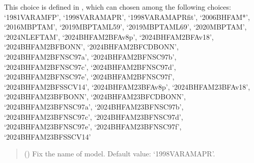 \documentclass[letterpaper,10pt,english]{sphinxmanual}
\begin{document}
\begin{fulllineitems}
\sphinxAtStartPar
This choice is defined in , which can chosen among     the following choices:     ‘1981\sphinxhyphen{}VAR\sphinxhyphen{}AM\sphinxhyphen{}FP’, ‘1998\sphinxhyphen{}VAR\sphinxhyphen{}AM\sphinxhyphen{}APR’, ‘1998\sphinxhyphen{}VAR\sphinxhyphen{}AM\sphinxhyphen{}APR\sphinxhyphen{}fit’, ‘2006\sphinxhyphen{}BHF\sphinxhyphen{}AM*’,     ‘2016\sphinxhyphen{}MBPT\sphinxhyphen{}AM’, ‘2019\sphinxhyphen{}MBPT\sphinxhyphen{}AM\sphinxhyphen{}L59’, ‘2019\sphinxhyphen{}MBPT\sphinxhyphen{}AM\sphinxhyphen{}L69’,     ‘2020\sphinxhyphen{}MBPT\sphinxhyphen{}AM’, ‘2024\sphinxhyphen{}NLEFT\sphinxhyphen{}AM’,     ‘2024\sphinxhyphen{}BHF\sphinxhyphen{}AM\sphinxhyphen{}2BF\sphinxhyphen{}Av8p’, ‘2024\sphinxhyphen{}BHF\sphinxhyphen{}AM\sphinxhyphen{}2BF\sphinxhyphen{}Av18’, ‘2024\sphinxhyphen{}BHF\sphinxhyphen{}AM\sphinxhyphen{}2BF\sphinxhyphen{}BONN’, ‘2024\sphinxhyphen{}BHF\sphinxhyphen{}AM\sphinxhyphen{}2BF\sphinxhyphen{}CDBONN’,     ‘2024\sphinxhyphen{}BHF\sphinxhyphen{}AM\sphinxhyphen{}2BF\sphinxhyphen{}NSC97a’, ‘2024\sphinxhyphen{}BHF\sphinxhyphen{}AM\sphinxhyphen{}2BF\sphinxhyphen{}NSC97b’, ‘2024\sphinxhyphen{}BHF\sphinxhyphen{}AM\sphinxhyphen{}2BF\sphinxhyphen{}NSC97c’, ‘2024\sphinxhyphen{}BHF\sphinxhyphen{}AM\sphinxhyphen{}2BF\sphinxhyphen{}NSC97d’,     ‘2024\sphinxhyphen{}BHF\sphinxhyphen{}AM\sphinxhyphen{}2BF\sphinxhyphen{}NSC97e’, ‘2024\sphinxhyphen{}BHF\sphinxhyphen{}AM\sphinxhyphen{}2BF\sphinxhyphen{}NSC97f’, ‘2024\sphinxhyphen{}BHF\sphinxhyphen{}AM\sphinxhyphen{}2BF\sphinxhyphen{}SSCV14’,     ‘2024\sphinxhyphen{}BHF\sphinxhyphen{}AM\sphinxhyphen{}23BF\sphinxhyphen{}Av8p’, ‘2024\sphinxhyphen{}BHF\sphinxhyphen{}AM\sphinxhyphen{}23BF\sphinxhyphen{}Av18’, ‘2024\sphinxhyphen{}BHF\sphinxhyphen{}AM\sphinxhyphen{}23BF\sphinxhyphen{}BONN’, ‘2024\sphinxhyphen{}BHF\sphinxhyphen{}AM\sphinxhyphen{}23BF\sphinxhyphen{}CDBONN’,     ‘2024\sphinxhyphen{}BHF\sphinxhyphen{}AM\sphinxhyphen{}23BF\sphinxhyphen{}NSC97a’, ‘2024\sphinxhyphen{}BHF\sphinxhyphen{}AM\sphinxhyphen{}23BF\sphinxhyphen{}NSC97b’, ‘2024\sphinxhyphen{}BHF\sphinxhyphen{}AM\sphinxhyphen{}23BF\sphinxhyphen{}NSC97c’, ‘2024\sphinxhyphen{}BHF\sphinxhyphen{}AM\sphinxhyphen{}23BF\sphinxhyphen{}NSC97d’,     ‘2024\sphinxhyphen{}BHF\sphinxhyphen{}AM\sphinxhyphen{}23BF\sphinxhyphen{}NSC97e’, ‘2024\sphinxhyphen{}BHF\sphinxhyphen{}AM\sphinxhyphen{}23BF\sphinxhyphen{}NSC97f’, ‘2024\sphinxhyphen{}BHF\sphinxhyphen{}AM\sphinxhyphen{}23BF\sphinxhyphen{}SSCV14’
\begin{quote}\begin{description}
\sphinxAtStartPar
{} (\sphinxstyleliteralemphasis{\sphinxupquote{, }}) \textendash{} Fix the name of model. Default value: ‘1998\sphinxhyphen{}VAR\sphinxhyphen{}AM\sphinxhyphen{}APR’.


\end{description}
\end{quote}
\end{fulllineitems}
\end{document}
